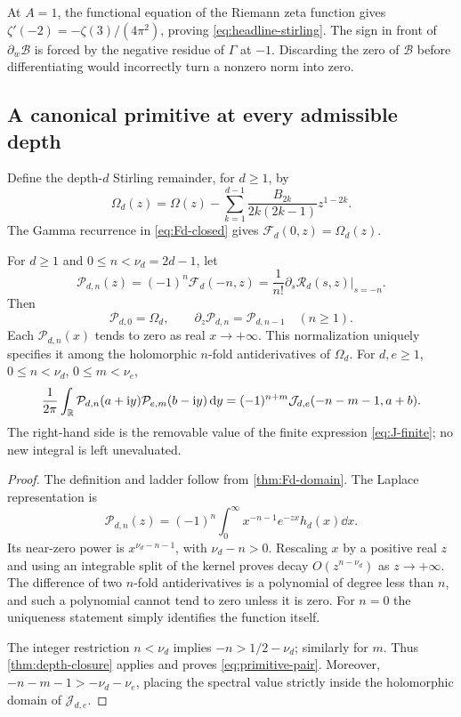 At $A=1$, the functional equation of the Riemann zeta function gives
$\zeta'(-2)=-\zeta(3)/(4\pi^2)$, proving
\eqref{eq:headline-stirling}. The sign in front of $\partial_w\mathcal B$
is forced by the negative residue of $\Gamma$ at $-1$.
Discarding the zero of $\mathcal B$ before differentiating would incorrectly
turn a nonzero norm into zero.

\subsection{A canonical primitive at every admissible depth}
Define the depth-$d$ Stirling remainder, for $d\ge1$, by
\begin{equation}\label{eq:Omega-depth}
 \Omega_d(z)=\Omega(z)-\sum_{k=1}^{d-1}
          \frac{B_{2k}}{2k(2k-1)}z^{1-2k}.
\end{equation}
The Gamma recurrence in \eqref{eq:Fd-closed} gives
$\mathcal F_d(0,z)=\Omega_d(z)$.

\begin{theorem}
\label{thm:primitive-ladder}
For $d\ge1$ and $0\le n<\nu_d=2d-1$, let
\begin{equation}\label{eq:primitive-definition}
 \mathcal P_{d,n}(z)=(-1)^n\mathcal F_d(-n,z)
      =\frac1{n!}\left.\partial_s\mathcal R_d(s,z)\right|_{s=-n}.
\end{equation}
Then
\begin{equation}\label{eq:primitive-ladder}
 \mathcal P_{d,0}=\Omega_d,\qquad
 \partial_z\mathcal P_{d,n}=\mathcal P_{d,n-1}\quad(n\ge1).
\end{equation}
Each $\mathcal P_{d,n}(x)$ tends to zero as real $x\to+\infty$.
This normalization uniquely specifies it among the holomorphic
$n$-fold antiderivatives of $\Omega_d$.
For $d,e\ge1$, $0\le n<\nu_d$, $0\le m<\nu_e$,
\begin{equation}\label{eq:primitive-pair}
 \frac1{2\pi}\int_{\mathbb R}\mathcal P_{d,n}(a+\mathrm i y)
                       \mathcal P_{e,m}(b-\mathrm i y)\,\mathrm d y
       =(-1)^{n+m}\mathcal J_{d,e}(-n-m-1,a+b).
\end{equation}
The right-hand side is the removable value of the finite expression
\eqref{eq:J-finite}; no new integral is left unevaluated.
\end{theorem}
\begin{proof}
The definition and ladder follow from \cref{thm:Fd-domain}. The Laplace
representation is
\[
 \mathcal P_{d,n}(z)=(-1)^n\int_0^\infty x^{-n-1}e^{-zx}h_d(x)\dd x.
\]
Its near-zero power is $x^{\nu_d-n-1}$, with $\nu_d-n>0$.
Rescaling $x$ by a positive real $z$ and using an integrable split of the
kernel proves decay $O(z^{n-\nu_d})$ as $z\to+\infty$.
The difference of two $n$-fold antiderivatives is a polynomial of degree
less than $n$, and such a polynomial cannot tend to zero unless it is zero.
For $n=0$ the uniqueness statement simply identifies the function itself.

The integer restriction $n<\nu_d$ implies
$-n>1/2-\nu_d$; similarly for $m$. Thus \cref{thm:depth-closure} applies
and proves \eqref{eq:primitive-pair}. Moreover,
$-n-m-1>-\nu_d-\nu_e$, placing the spectral value strictly inside the
holomorphic domain of $\mathcal J_{d,e}$.
\end{proof}

